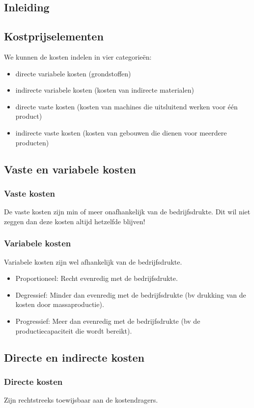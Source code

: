 \documentclass[12pt]{article}
\begin{document}
\subsection{Inleiding}
\subsection{Kostprijselementen}
We kunnen de kosten indelen in vier categorie\"en:
\begin{itemize}
\item directe variabele kosten (grondstoffen)
\item indirecte variabele kosten (kosten van indirecte materialen)
\item directe vaste kosten (kosten van machines die uitsluitend werken voor \'e\'en product)
\item indirecte vaste kosten (kosten van gebouwen die dienen voor meerdere producten)
\end{itemize}
\subsection{Vaste en variabele kosten}
\subsubsection{Vaste kosten}
De vaste kosten zijn min of meer onafhankelijk van de bedrijfsdrukte. Dit wil niet zeggen dan deze kosten altijd hetzelfde blijven!
\subsubsection{Variabele kosten}
Variabele kosten zijn wel afhankelijk van de bedrijfsdrukte.
\begin{itemize}
\item Proportioneel: Recht evenredig met de bedrijfsdrukte.
\item Degressief: Minder dan evenredig met de bedrijfsdrukte (bv drukking van de kosten door massaproductie).
\item Progressief: Meer dan evenredig met de bedrijfsdrukte (bv de productiecapaciteit die wordt bereikt).
\end{itemize}
\subsection{Directe en indirecte kosten}
\subsubsection{Directe kosten}
Zijn rechtstreeks toewijsbaar aan de kostendragers.
\end{document}
